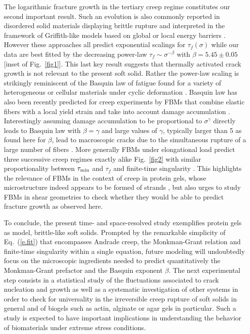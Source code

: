 \documentclass[twocolumn,superscriptaddress,showpacs,preprintnumbers,amsmath,amssymb,prl]{revtex4}
\begin{document}
The logarithmic fracture growth in the tertiary creep regime constitutes our second important result. Such an evolution is also commonly reported in disordered solid materials displaying brittle rupture and interpreted in the framework of Griffith-like models based on global or local energy barriers \cite{Vanel:2009}. However these approaches all predict exponential scalings for $\tau_f(\sigma)$ while our data are best fitted by the decreasing power-law $\tau_f \sim \sigma^{-\beta}$ with $\beta=5.45\pm 0.05$ [inset of Fig.~\ref{fig1}]. This last key result suggests that thermally activated crack growth is not relevant to the present soft solid. Rather the power-law scaling is strikingly reminiscent of the Basquin law of fatigue found for a variety of heterogeneous or cellular materials under cyclic deformation \cite{Kun:2007,Basquin:1910,Kohout:2000}. Basquin law has also been recently predicted for creep experiments by FBMs that combine elastic fibers with a local yield strain and take into account damage accumulation \cite{Kun:2007,Halasz:2012}. Interestingly assuming damage accumulation to be proportional to $\sigma^\gamma$ directly leads to Basquin law with $\beta=\gamma$ and large values of $\gamma$, typically larger than 5 as found here for $\beta$, lead to macroscopic cracks due to the simultaneous rupture of a large number of fibers \cite{Halasz:2012}. More generally FBMs under elongational load predict three successive creep regimes exactly alike Fig.~\ref{fig2} with similar proportionality between $\tau_{\rm min}$ and $\tau_f$ and finite-time singularity \cite{Nechad:2005,Jagla:2011}. This highlights the relevance of FBMs in the context of creep in protein gels, whose microstructure indeed appears to be formed of strands \cite{Kalab:1983,Roefs:1990}, but also urges to study FBMs in shear geometries to check whether they would be able to predict fracture growth as observed here.

To conclude, the present time- and space-resolved study exemplifies protein gels as model, brittle-like soft solids. Prompted by the remarkable simplicity of Eq.~(\ref{e.fit}) that encompasses Andrade creep, the Monkman-Grant relation and finite-time singularity within a single equation, future modeling will undoubtedly focus on the microscopic ingredients needed to predict quantitatively the Monkman-Grant prefactor and the Basquin exponent $\beta$. The next experimental step consists in a statistical study of the fluctuations associated to crack nucleation and growth as well as a systematic investigation of other systems in order to check for universality in the irreversible creep rupture of soft solids in general and of biogels such as actin, alginate or agar gels in particular. Such a study is expected to have important implications in understanding the behavior of biomaterials under extreme stress conditions.
\end{document}
